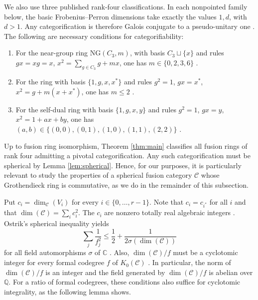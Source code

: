 \documentclass[11pt]{amsart}
\theoremstyle{definition}
\newcommand{\C}{\mathbb C}
\newcommand{\Q}{\mathbb Q}
\newcommand{\Near}{\mathrm{NG}}
\numberwithin{equation}{section}
\begin{document}
We also use three published rank-four classifications. In each nonpointed
family below, the basic Frobenius--Perron dimensions take exactly the
values $1,d$, with $d>1$. Any categorification is therefore Galois
conjugate to a pseudo-unitary one \cite[Lemma~3.1]{Schopieray}.
The following are necessary conditions for categorifiability:
\begin{enumerate}
\item For the near-group ring $\Near(C_3,m)$, with basis $C_3\sqcup\{x\}$
and rules $gx=xg=x$, $x^2=\sum_{g\in C_3}g+mx$, one has
$m\in\{0,2,3,6\}$ \cite[Theorem~1.1]{Larson}.
\item For the ring with basis $\{1,g,x,x^*\}$ and rules
$g^2=1$, $gx=x^*$, $x^2=g+m(x+x^*)$, one has $m\leq2$
\cite[Theorem~1.1]{Larson}.
\item For the self-dual ring with basis $\{1,g,x,y\}$ and rules
$g^2=1$, $gx=y$, $x^2=1+ax+by$, one has
$(a,b)\in\{(0,0),(0,1),(1,0),(1,1),(2,2)\}$
\cite[Theorem~2.4]{EIP}.
\end{enumerate}

Up to fusion ring isomorphism, Theorem \ref{thm:main} classifies all fusion rings of rank four admitting a pivotal categorification.
Any such categorification must be spherical by Lemma \ref{lem:spherical}. 
Hence, for our purposes, it is particularly relevant to study the properties of a spherical fusion category $\mathcal{C}$ whose Grothendieck ring is commutative, as we do in the remainder of this subsection. 

Put $c_i=\dim_{\mathcal C}(V_i)$ for every $i\in\{0,\dots,r-1\}$. 
Note that $c_i=c_{i^*}$ for all $i$ and that $\dim(\mathcal C)=\sum_i c_i^2$. 
The $c_i$ are nonzero totally real algebraic integers \cite[\S2.1]{OstrikRank3}.
Ostrik's spherical inequality yields
\begin{equation}\label{eq:spherical-mass}
\sum_j \frac{1}{f_j^2} \leq\frac12+\frac1{2\sigma(\dim(\mathcal C))}
\end{equation}
for all field automorphisms $\sigma$ of $\C$ \cite[Theorem~3.1.1 and Remark~3.1.2]{OstrikGlobal}.  
Also, $\dim(\mathcal C)/f$ must be a cyclotomic integer for every formal codegree $f$ of $K_0(\mathcal{C})$ \cite[Theorem~2.13]{OstrikRank3}.
In particular, the norm of $\dim(\mathcal C)/f$ is an integer and the field generated by $\dim(\mathcal C)/f$ is abelian over $\Q$. 
For a ratio of formal codegrees, these conditions also suffice for cyclotomic integrality, as the following lemma shows. 
\end{document}
